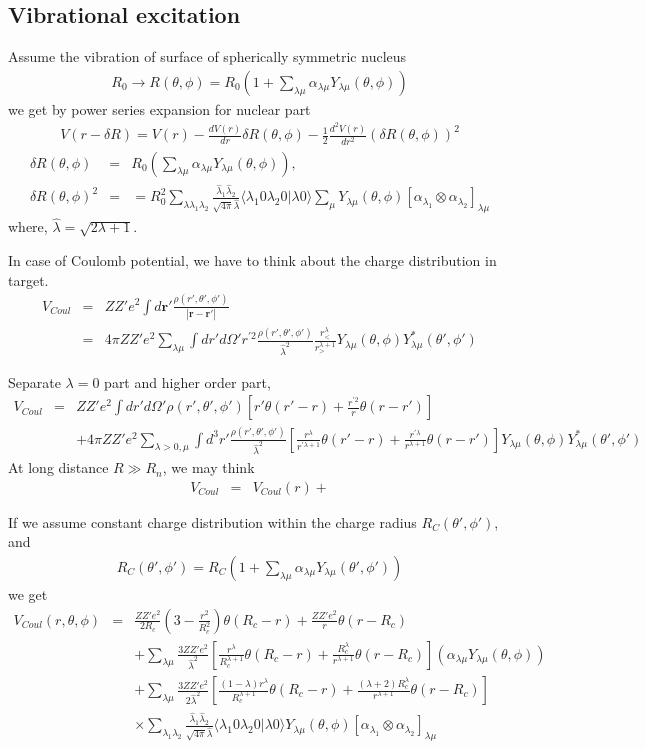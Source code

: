 \documentclass[11pt]{book}
\def\bm{\boldsymbol}
\def\vr{{\bm r}}
\def\la{\langle}
\def\ra{\rangle}
\newcommand{\bea}{\begin{eqnarray}}
\newcommand{\eea}{\end{eqnarray}}
\newcommand{\no}{\nonumber \\}
\begin{document}
\subsection{Vibrational excitation}
Assume the vibration of surface of spherically symmetric nucleus
\bea 
R_0\to R(\theta,\phi)=
 R_0\left(1+\sum_{\lambda\mu}\alpha_{\lambda\mu}Y_{\lambda\mu}(\theta,\phi)\right) 
\eea 
we get by power series expansion for nuclear part
\bea 
V(r-\delta R)=V(r)-\frac{d V(r)}{dr}\delta R(\theta,\phi)
                  -\frac{1}{2}\frac{d^2 V(r)}{dr^2}(\delta R(\theta,\phi))^2
\eea 
\bea 
\delta R(\theta,\phi)&=& R_0 \left( \sum_{\lambda\mu} 
     \alpha_{\lambda\mu} Y_{\lambda\mu}(\theta,\phi) \right) ,\no 
\delta R(\theta,\phi)^2&=& 
 =R_0^2 \sum_{\lambda \lambda_1\lambda_2}\frac{\hat{\lambda}_1\hat{\lambda}_2}{\sqrt{4\pi} \hat{\lambda}} \la \lambda_1 0 \lambda_2 0|\lambda 0\ra 
 \sum_{\mu} Y_{\lambda\mu}(\theta,\phi) [\alpha_{\lambda_1}\otimes \alpha_{\lambda_2}]_{\lambda\mu}
\eea 
where, $\hat{\lambda}=\sqrt{2\lambda+1}$.

In case of Coulomb potential, we have to think about the charge distribution in target. 
\bea 
V_{Coul} &=& ZZ' e^2\int d \vr' \frac{\rho(r',\theta',\phi')}{|\vr-\vr'|} \no 
         &=& 4\pi Z Z' e^2 \sum_{\lambda \mu}
         \int dr' d\Omega' r^{'2} \frac{ \rho(r',\theta',\phi')}{  \hat{\lambda}^{2}}
          \frac{r^{\lambda}_{<}}{r^{\lambda+1}_{>}}
          Y_{\lambda\mu}(\theta,\phi) Y^*_{\lambda\mu}(\theta',\phi')
\eea 

Separate $\lambda=0$ part and higher order part,
\bea 
V_{Coul} &=&  Z Z' e^2 
\int dr' d\Omega'  \rho(r',\theta',\phi')\left[r' \theta(r'-r)+ \frac{r^{'2}}{r}\theta(r-r') \right] \no 
& &+4\pi Z Z' e^2 \sum_{\lambda>0, \mu}
          \int d^3 r'  \frac{ \rho(r',\theta',\phi')}{  \hat{\lambda}^{2}}
          \left[ \frac{r^\lambda}{r^{'\lambda+1}}\theta(r'-r)
                +\frac{r^{'\lambda}}{r^{\lambda+1}}\theta(r-r') 
          \right] Y_{\lambda\mu}(\theta,\phi) Y^*_{\lambda\mu}(\theta',\phi')
\eea 
At long distance $R\gg R_n$, we may think 
\bea 
V_{Coul} &=& V_{Coul}(r)+
\eea 

If we assume constant charge distribution within the charge radius $R_C(\theta',\phi')$,
and 
\bea
 R_C(\theta',\phi')=R_C\left(1+\sum_{\lambda\mu}\alpha_{\lambda\mu}Y_{\lambda\mu}(\theta',\phi')\right)
\eea 
we get 
\bea 
V_{Coul}(r,\theta,\phi)&=& \frac{ZZ' e^2}{2 R_c}(3-\frac{r^2}{R_c^2})\theta(R_c-r)
           +\frac{ZZ'e^2}{r} \theta(r-R_c)  \no 
        & &+\sum_{\lambda\mu} \frac{3 ZZ' e^2}{\hat{\lambda}^2}
          [\frac{r^\lambda}{R_c^{\lambda+1}}\theta(R_c-r)
          +\frac{R_c^\lambda}{r^{\lambda+1}}\theta(r-R_c)] 
          (\alpha_{\lambda\mu} Y_{\lambda\mu}(\theta,\phi)) \no 
        & &+\sum_{\lambda\mu} \frac{3 ZZ' e^2}{2\hat{\lambda}^2}  
         [\frac{(1-\lambda)r^\lambda}{R_c^{\lambda+1}}\theta(R_c-r)
                   +\frac{(\lambda+2)R_c^\lambda}{r^{\lambda+1}}\theta(r-R_c)]
                   \no & & 
         \times  \sum_{\lambda_1\lambda_2}\frac{\hat{\lambda}_1\hat{\lambda}_2}{\sqrt{4\pi} \hat{\lambda}} \la \lambda_1 0 \lambda_2 0|\lambda 0\ra 
          Y_{\lambda\mu}(\theta,\phi) [\alpha_{\lambda_1}\otimes \alpha_{\lambda_2}]_{\lambda\mu}  
\eea 
\end{document}
